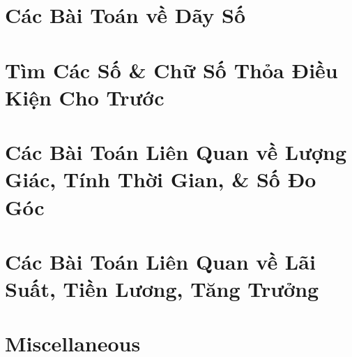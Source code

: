 \documentclass{article}
\begin{document}

\section{Các Bài Toán về Dãy Số}


\section{Tìm Các Số \& Chữ Số Thỏa Điều Kiện Cho Trước}


\section{Các Bài Toán Liên Quan về Lượng Giác, Tính Thời Gian, \& Số Đo Góc}


\section{Các Bài Toán Liên Quan về Lãi Suất, Tiền Lương, Tăng Trưởng}


\section{Miscellaneous}


\printbibliography[heading=bibintoc]
	
\end{document}
